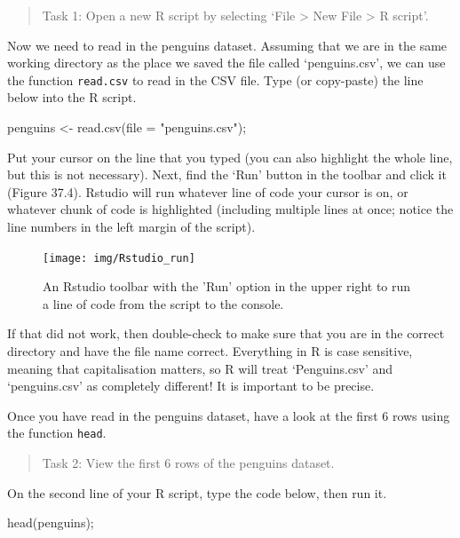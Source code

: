 \documentclass[
]{scrbook}
\newenvironment{Shaded}{\begin{snugshade}}{\end{snugshade}}
\newcommand{\AttributeTok}[1]{\textcolor[rgb]{0.77,0.63,0.00}{#1}}
\newcommand{\FunctionTok}[1]{\textcolor[rgb]{0.00,0.00,0.00}{#1}}
\newcommand{\NormalTok}[1]{#1}
\newcommand{\OtherTok}[1]{\textcolor[rgb]{0.56,0.35,0.01}{#1}}
\newcommand{\StringTok}[1]{\textcolor[rgb]{0.31,0.60,0.02}{#1}}
\begin{document}
\begin{quote}
Task 1: Open a new R script by selecting `File \textgreater{} New File \textgreater{} R script'.
\end{quote}

Now we need to read in the penguins dataset.
Assuming that we are in the same working directory as the place we saved the file called `penguins.csv', we can use the function \texttt{read.csv} to read in the CSV file.
Type (or copy-paste) the line below into the R script.

\begin{Shaded}
\begin{Highlighting}[]
\NormalTok{penguins }\OtherTok{\textless{}{-}} \FunctionTok{read.csv}\NormalTok{(}\AttributeTok{file =} \StringTok{"penguins.csv"}\NormalTok{);}
\end{Highlighting}
\end{Shaded}

Put your cursor on the line that you typed (you can also highlight the whole line, but this is not necessary).
Next, find the `Run' button in the toolbar and click it (Figure 37.4).
Rstudio will run whatever line of code your cursor is on, or whatever chunk of code is highlighted (including multiple lines at once; notice the line numbers in the left margin of the script).

\begin{figure}
\texttt{[image: img/Rstudio\_run]} \caption{An Rstudio toolbar with the 'Run' option in the upper right to run a line of code from the script to the console.}\label{fig:unnamed-chunk-224}
\end{figure}

If that did not work, then double-check to make sure that you are in the correct directory and have the file name correct.
Everything in R is case sensitive, meaning that capitalisation matters, so R will treat `Penguins.csv' and `penguins.csv' as completely different!
It is important to be precise.

Once you have read in the penguins dataset, have a look at the first 6 rows using the function \texttt{head}.

\begin{quote}
Task 2: View the first 6 rows of the penguins dataset.
\end{quote}

On the second line of your R script, type the code below, then run it.

\begin{Shaded}
\begin{Highlighting}[]
\FunctionTok{head}\NormalTok{(penguins);}
\end{Highlighting}
\end{Shaded}
\end{document}
